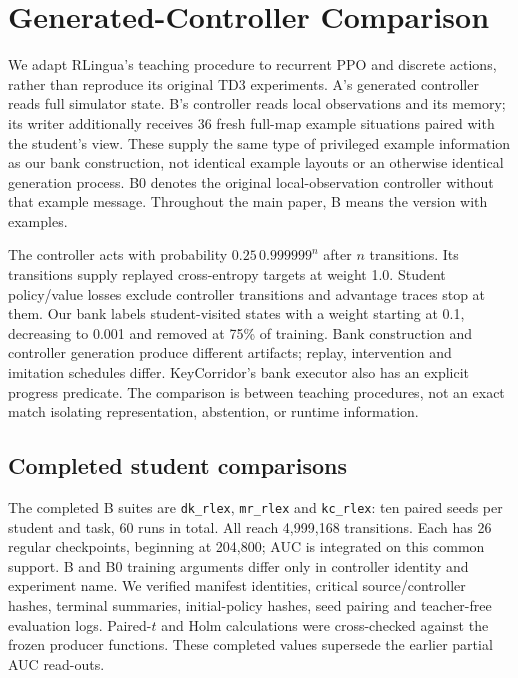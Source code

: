 \section{Generated-Controller Comparison}\label{generated-controller-comparison}

We adapt RLingua's teaching procedure to recurrent PPO and discrete actions,
rather than reproduce its original TD3 experiments. A's generated controller
reads full simulator state. B's controller reads local observations and its
memory; its writer additionally receives 36 fresh full-map example situations
paired with the student's view. These supply the same type of privileged
example information as our bank construction, not identical example layouts
or an otherwise identical generation process. B0 denotes the original
local-observation controller without that example message. Throughout the
main paper, B means the version with examples.

The controller acts with probability $0.25\,0.999999^n$ after $n$ transitions.
Its transitions supply replayed cross-entropy targets at weight 1.0. Student
policy/value losses exclude controller transitions and advantage traces stop
at them. Our bank labels student-visited states with a weight starting at
0.1, decreasing to 0.001 and removed at 75\% of training. Bank construction
and controller generation produce different artifacts; replay, intervention
and imitation schedules differ. KeyCorridor's bank executor also has an
explicit progress predicate. The comparison is between teaching procedures,
not an exact match isolating representation, abstention, or runtime information.

\subsection{Completed student comparisons}
The completed B suites are \texttt{dk\_rlex}, \texttt{mr\_rlex} and
\texttt{kc\_rlex}: ten paired seeds per student and task, 60 runs in total.
All reach 4,999,168 transitions. Each has 26 regular checkpoints, beginning
at 204,800; AUC is integrated on this common support. B and B0 training
arguments differ only in controller identity and experiment name. We verified
manifest identities, critical source/controller hashes, terminal summaries,
initial-policy hashes, seed pairing and teacher-free evaluation logs.
Paired-$t$ and Holm calculations were cross-checked against the frozen
producer functions. These completed values supersede the earlier partial
AUC read-outs.


